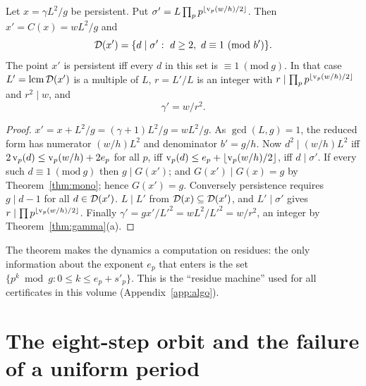 \begin{theorem}\label{thm:onestep}
Let \(x=\gamma L^2/g\) be persistent. Put \(\sigma'=L\prod_pp^{\lfloor\operatorname{v}_p(w/h)/2\rfloor}\). Then \(x'=C(x)=wL^2/g\) and
\[
\Dx(x')=\{d\mid\sigma':\ d\ge2,\ d\equiv1\ (\mathrm{mod}\ b')\}.
\]
The point \(x'\) is persistent iff every \(d\) in this set is \(\equiv1\ (\mathrm{mod}\ g)\). In that case \(L'=\mathrm{lcm}\,\mathcal{D}(x')\) is a multiple of \(L\), \(r=L'/L\) is an integer with \(r\mid\prod_pp^{\lfloor\operatorname{v}_p(w/h)/2\rfloor}\) and \(r^2\mid w\), and
\[
\gamma'=w/r^2.
\]
\end{theorem}
\begin{proof}
\(x'=x+L^2/g=(\gamma+1)L^2/g=wL^2/g\). As \(\gcd(L,g)=1\), the reduced form has numerator \((w/h)L^2\) and denominator \(b'=g/h\). Now \(d^2\mid(w/h)L^2\) iff \(2\operatorname{v}_p(d)\le\operatorname{v}_p(w/h)+2e_p\) for all \(p\), iff \(\operatorname{v}_p(d)\le e_p+\lfloor\operatorname{v}_p(w/h)/2\rfloor\), iff \(d\mid\sigma'\). If every such \(d\equiv1\ (\mathrm{mod}\ g)\) then \(g\mid G(x')\); and \(G(x')\mid G(x)=g\) by Theorem~\ref{thm:mono}; hence \(G(x')=g\). Conversely persistence requires \(g\mid d-1\) for all \(d\in\mathcal{D}(x')\). \(L\mid L'\) from \(\mathcal{D}(x)\subseteq\mathcal{D}(x')\), and \(L'\mid\sigma'\) gives \(r\mid\prod p^{\lfloor\operatorname{v}_p(w/h)/2\rfloor}\). Finally \(\gamma'=gx'/L'^2=wL^2/L'^2=w/r^2\), an integer by Theorem~\ref{thm:gamma}(a).
\end{proof}

The theorem makes the dynamics a computation on residues: the only information about the exponent \(e_p\) that enters is the set \(\{p^k\bmod g:0\le k\le e_p+s'_p\}\). This is the ``residue machine'' used for all certificates in this volume (Appendix~\ref{app:algo}).

\section{The eight-step orbit and the failure of a uniform period}

